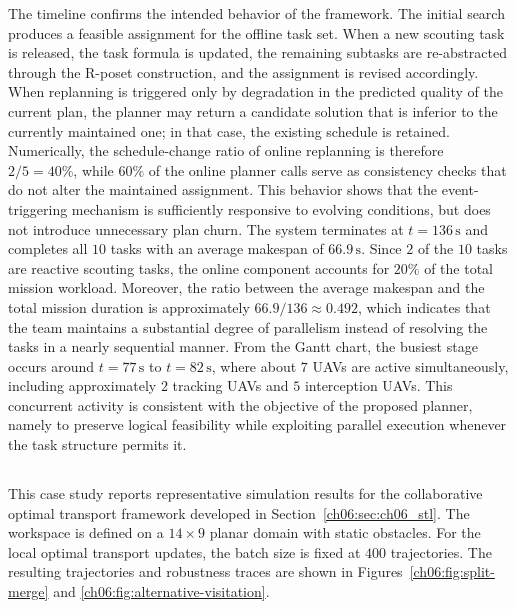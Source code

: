 The timeline confirms the intended behavior of the framework. The
initial search produces a feasible assignment for the offline task set.
When a new scouting task is released, the task formula is updated, the
remaining subtasks are re-abstracted through the R-poset construction,
and the assignment is revised accordingly. When replanning is triggered
only by degradation in the predicted quality of the current plan, the
planner may return a candidate solution that is inferior to the
currently maintained one; in that case, the existing schedule is
retained. Numerically, the schedule-change ratio of online replanning is
therefore $2/5=40\%$, while $60\%$ of the online planner calls serve as
consistency checks that do not alter the maintained assignment. This
behavior shows that the event-triggering mechanism is sufficiently
responsive to evolving conditions, but does not introduce unnecessary
plan churn.
The system terminates at $t=136\,\mathrm{s}$ and completes all
$10$ tasks with an average makespan of $66.9\,\mathrm{s}$. Since
$2$ of the $10$ tasks are reactive scouting tasks, the online component
accounts for $20\%$ of the total mission workload. Moreover, the ratio
between the average makespan and the total mission duration is
approximately $66.9/136 \approx 0.492$, which indicates that the team
maintains a substantial degree of parallelism instead of resolving the
tasks in a nearly sequential manner. From the Gantt chart, the busiest
stage occurs around $t=77\,\mathrm{s}$ to $t=82\,\mathrm{s}$, where
about $7$ UAVs are active simultaneously, including approximately
$2$ tracking UAVs and $5$ interception UAVs. This concurrent activity
is consistent with the objective of the proposed planner, namely to
preserve logical feasibility while exploiting parallel execution
whenever the task structure permits it.

\subsection{}
\label{ch06:subsec:case_stl}

This case study reports representative simulation results for the
collaborative optimal transport framework developed in
Section~\ref{ch06:sec:ch06_stl}. 
 The workspace is defined on a
$14 \times 9$ planar domain with static obstacles. For the local
optimal transport updates, the batch size is fixed at
$400$ trajectories. The resulting trajectories and robustness traces are
shown in Figures~\ref{ch06:fig:split-merge} and
\ref{ch06:fig:alternative-visitation}.

